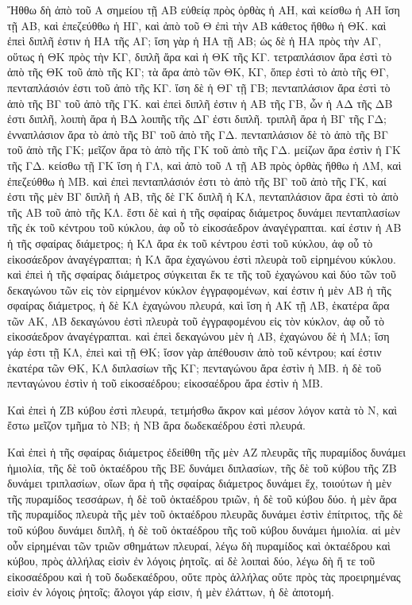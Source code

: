 \begin{Parallel}{}{}
{{\greekfont Ἤθθω δὴ ἀπὸ τοῦ Α σημείου τῇ ΑΒ εὐθείᾳ
πρὸς ὀρθὰς ἡ ΑΗ, καὶ κείσθω ἡ ΑΗ ἴση τῇ ΑΒ,
καὶ ἐπεζεύθθω ἡ ΗΓ, καὶ ἀπὸ τοῦ Θ ἐπὶ
τὴν ΑΒ κάθετος ἤθθω ἡ ΘΚ. καὶ ἐπεὶ διπλῆ ἐστιν
ἡ ΗΑ τῆς ΑΓ; ἴση γὰρ ἡ ΗΑ τῇ ΑΒ; ὡς δὲ ἡ ΗΑ
πρὸς τὴν ΑΓ, οὕτως ἡ ΘΚ πρὸς τὴν ΚΓ, διπλῆ ἄρα
καὶ ἡ ΘΚ τῆς ΚΓ. τετραπλάσιον ἄρα ἐστὶ τὸ ἀπὸ
τῆς ΘΚ τοῦ ἀπὸ τῆς ΚΓ; τὰ ἄρα ἀπὸ τῶν ΘΚ, ΚΓ,
ὅπερ ἐστὶ τὸ ἀπὸ τῆς ΘΓ, πενταπλάσιόν  ἐστι τοῦ
ἀπὸ τῆς ΚΓ. ἴση δὲ ἡ ΘΓ τῇ ΓΒ; πενταπλάσιον
ἄρα ἐστὶ τὸ ἀπὸ τῆς ΒΓ τοῦ ἀπὸ τῆς ΓΚ. καὶ
ἐπεὶ διπλῆ ἐστιν ἡ ΑΒ τῆς ΓΒ, ὧν ἡ ΑΔ τῆς
ΔΒ ἐστι διπλῆ,  λοιπὴ ἄρα ἡ ΒΔ λοιπῆς τῆς ΔΓ ἐστι
διπλῆ. τριπλῆ ἄρα ἡ ΒΓ τῆς ΓΔ; ἐνναπλάσιον ἄρα τὸ
ἀπὸ τῆς ΒΓ τοῦ ἀπὸ τῆς ΓΔ. πενταπλάσιον δὲ τὸ ἀπὸ
τῆς ΒΓ τοῦ ἀπὸ τῆς ΓΚ; μεῖζον ἄρα τὸ ἀπὸ τῆς
ΓΚ τοῦ ἀπὸ τῆς ΓΔ. μείζων ἄρα ἐστὶν ἡ ΓΚ τῆς
ΓΔ. κείσθω τῇ ΓΚ ἴση ἡ ΓΛ, καὶ ἀπὸ τοῦ Λ τῇ
ΑΒ πρὸς ὀρθὰς ἤθθω ἡ ΛΜ, καὶ ἐπεζεύθθω ἡ ΜΒ.
καὶ ἐπεὶ πενταπλάσιόν ἐστι τὸ ἀπὸ  τῆς ΒΓ τοῦ ἀπὸ τῆς
ΓΚ, καί ἐστι τῆς μὲν ΒΓ διπλῆ ἡ ΑΒ, τῆς δὲ ΓΚ διπλῆ
ἡ ΚΛ, πενταπλάσιον ἄρα ἐστὶ τὸ ἀπὸ τῆς ΑΒ τοῦ ἀπὸ τῆς
ΚΛ.
ἔστι δὲ καὶ ἡ τῆς σφαίρας διάμετρος δυνάμει πενταπλασίων
τῆς ἐκ τοῦ κέντρου τοῦ κύκλου, ἀφ οὗ τὸ εἰκοσάεδρον
ἀναγέγραπται. καί ἐστιν ἡ ΑΒ ἡ τῆς σφαίρας διάμετρος;
ἡ ΚΛ ἄρα ἐκ τοῦ κέντρου ἐστὶ τοῦ κύκλου, ἀφ οὗ
τὸ εἰκοσάεδρον ἀναγέγραπται; ἡ ΚΛ ἄρα ἑχαγώνου ἐστὶ
πλευρὰ τοῦ εἰρημένου κύκλου. καὶ ἐπεὶ ἡ τῆς σφαίρας
διάμετρος σύγκειται ἔκ τε τῆς τοῦ ἑχαγώνου καὶ δύο τῶν
τοῦ δεκαγώνου τῶν εἰς τὸν εἰρημένον κύκλον ἐγγραφομένων,
καί ἐστιν ἡ μὲν ΑΒ ἡ τῆς σφαίρας διάμετρος, ἡ δὲ ΚΛ
ἑχαγώνου πλευρά, καὶ ἴση ἡ ΑΚ τῇ ΛΒ, ἑκατέρα ἄρα τῶν
ΑΚ, ΛΒ δεκαγώνου ἐστὶ πλευρὰ τοῦ ἐγγραφομένου εἰς
τὸν κύκλον, ἀφ οὗ τὸ εἰκοσάεδρον ἀναγέγραπται. καὶ
ἐπεὶ δεκαγώνου μὲν ἡ ΛΒ, ἑχαγώνου δὲ ἡ ΜΛ;
ἴση γάρ ἐστι τῇ ΚΛ, ἐπεὶ καὶ τῇ ΘΚ; ἴσον γὰρ ἀπέθουσιν
ἀπὸ τοῦ κέντρου; καί ἐστιν ἑκατέρα τῶν ΘΚ, ΚΛ διπλασίων
τῆς ΚΓ; πενταγώνου ἄρα ἐστὶν ἡ ΜΒ. ἡ δὲ τοῦ πενταγώνου
ἐστὶν ἡ τοῦ εἰκοσαέδρου; εἰκοσαέδρου ἄρα ἐστὶν ἡ ΜΒ.}

{\greekfont Καὶ ἐπεὶ ἡ ΖΒ κύβου ἐστὶ πλευρά, τετμήσθω ἄκρον καὶ
μέσον λόγον κατὰ τὸ Ν, καὶ ἔστω μεῖζον τμῆμα τὸ
ΝΒ; ἡ ΝΒ ἄρα δωδεκαέδρου ἐστὶ πλευρά.}

{\greekfont Καὶ ἐπεὶ ἡ τῆς σφαίρας διάμετρος ἐδείθθη τῆς μὲν
ΑΖ πλευρᾶς τῆς πυραμίδος δυνάμει ἡμιολία, τῆς δὲ
τοῦ ὀκταέδρου τῆς ΒΕ δυνάμει διπλασίων, τῆς δὲ τοῦ
κύβου τῆς ΖΒ δυνάμει τριπλασίων, οἵων ἄρα ἡ τῆς
σφαίρας διάμετρος δυνάμει ἕχ, τοιούτων ἡ μὲν τῆς
πυραμίδος τεσσάρων, ἡ δὲ τοῦ ὀκταέδρου τριῶν, ἡ δὲ
τοῦ κύβου δύο.  ἡ μὲν ἄρα τῆς πυραμίδος πλευρὰ
τῆς μὲν τοῦ ὀκταέδρου πλευρᾶς δυνάμει ἐστὶν ἐπίτριτος,
τῆς δὲ τοῦ κύβου δυνάμει διπλῆ, ἡ δὲ τοῦ ὀκταέδρου τῆς
τοῦ κύβου δυνάμει ἡμιολία. αἱ μὲν οὖν εἰρημέναι
τῶν τριῶν σθημάτων πλευραί, λέγω δὴ πυραμίδος καὶ ὀκταέδρου
καὶ κύβου, πρὸς ἀλλήλας εἰσὶν ἐν λόγοις ῥητοῖς. αἱ δὲ λοιπαὶ
δύο, λέγω δὴ ἥ τε τοῦ εἰκοσαέδρου καὶ ἡ τοῦ δωδεκαέδρου,
οὔτε πρὸς ἀλλήλας οὔτε πρὸς τὰς προειρημένας εἰσὶν ἐν λόγοις
ῥητοῖς; ἄλογοι γάρ εἰσιν, ἡ μὲν ἐλάττων, ἡ δὲ ἀποτομή.}

}
\end{Parallel}
